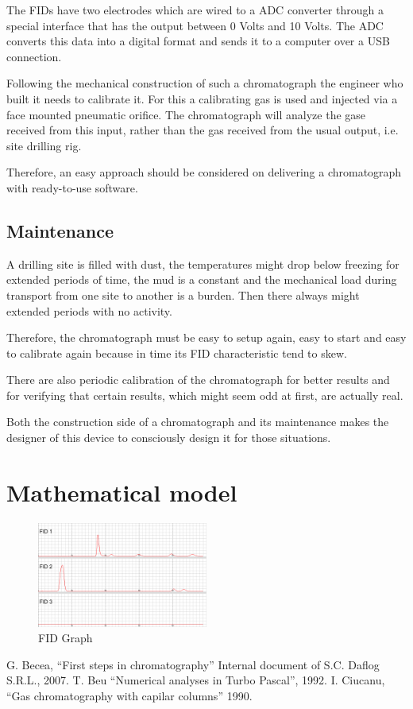 \documentclass[conference]{IEEEtran}
\begin{document}
    The FIDs have two electrodes which are wired to a ADC converter through a special interface that has the output between
    0 Volts and 10 Volts. The ADC converts this data into a digital format and sends it to a computer over a USB connection.

    Following the mechanical construction of such a chromatograph the engineer who built it needs to calibrate it. For this
    a calibrating gas is used and injected via a face mounted pneumatic orifice. The chromatograph will analyze the gase received
    from this input, rather than the gas received from the usual output, i.e. site drilling rig.
    
    Therefore, an easy approach should be considered on delivering a chromatograph with ready-to-use software.
    
\subsection{Maintenance}

    A drilling site is filled with dust, the temperatures might drop below freezing for extended periods of time, the mud is
    a constant and the mechanical load during transport from one site to another is a burden. Then there always might extended
    periods with no activity. 

    Therefore, the chromatograph must be easy to setup again, easy to start and easy to calibrate again because in time its 
    FID characteristic tend to skew.

    There are also periodic calibration of the chromatograph for better results and for verifying that certain results, which
    might seem odd at first, are actually real.

    Both the construction side of a chromatograph and its maintenance makes the designer of this device to consciously design
    it for those situations.

\section{Mathematical model}

    \begin{figure}
        \centering
        \includegraphics[width=0.5\textwidth]{fidgraph.png}
        \caption{FID Graph}
    \end{figure}


\begin{thebibliography}{00}
 G. Becea, ``First steps in chromatography'' Internal document of S.C. Daflog S.R.L., 2007.
 T. Beu ``Numerical analyses in Turbo Pascal'', 1992.
 I. Ciucanu, ``Gas chromatography with capilar columns'' 1990.
\end{thebibliography}
\vspace{12pt}
\end{document}
